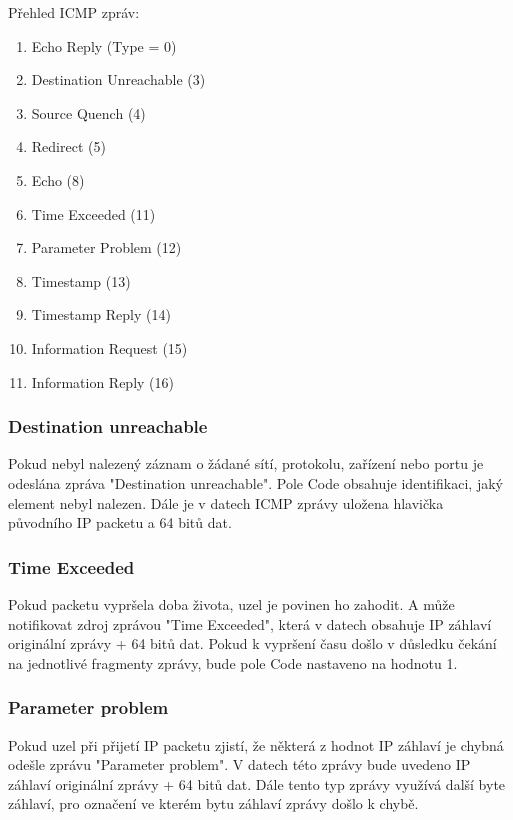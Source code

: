 \documentclass[12pt, a4paper]{article}
\begin{document}
Přehled ICMP zpráv:

\begin{enumerate}
\item Echo Reply (Type = 0)
\item Destination Unreachable (3)
\item Source Quench (4)
\item Redirect (5)
\item Echo (8)
\item Time Exceeded (11)
\item Parameter Problem (12)
\item Timestamp (13)
\item Timestamp Reply (14)
\item Information Request (15)
\item Information Reply (16)
\end{enumerate}

\subsubsection{Destination unreachable}

Pokud nebyl nalezený záznam o žádané sítí, protokolu, zařízení nebo portu je odeslána zpráva "Destination unreachable". Pole Code obsahuje identifikaci, jaký element nebyl nalezen. Dále je v datech ICMP zprávy uložena hlavička původního IP packetu a 64 bitů dat. 

\subsubsection{Time Exceeded}

Pokud packetu vypršela doba života, uzel je povinen ho zahodit. A může notifikovat zdroj zprávou "Time Exceeded", která v datech obsahuje IP záhlaví originální zprávy + 64 bitů dat. Pokud k vypršení času došlo v důsledku čekání na jednotlivé fragmenty zprávy, bude pole Code nastaveno na hodnotu 1.

\subsubsection{Parameter problem}

Pokud uzel při přijetí IP packetu zjistí, že některá z hodnot IP záhlaví je chybná odešle zprávu "Parameter problem". V datech této zprávy bude uvedeno IP záhlaví originální zprávy + 64 bitů dat. Dále tento typ zprávy využívá další byte záhlaví, pro označení ve kterém bytu záhlaví zprávy došlo k chybě.
\end{document}
